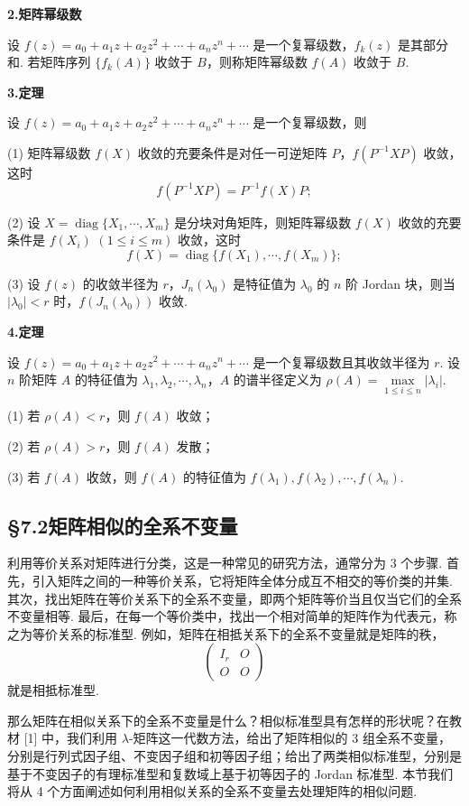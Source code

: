 \documentclass[UTF8,12pt,a4paper,fontset=fandol]{ctexart}
\begin{document}
\noindent\textbf{2.\quad 矩阵幂级数}

设 $f(z)=a_0+a_1z+a_2z^2+\cdots+a_nz^n+\cdots$ 是一个复幂级数，$f_k(z)$ 是其部分和. 若矩阵序列 $\{f_k(A)\}$ 收敛于 $B$，则称矩阵幂级数 $f(A)$ 收敛于 $B$.

\noindent\textbf{3.\quad 定理}

设 $f(z)=a_0+a_1z+a_2z^2+\cdots+a_nz^n+\cdots$ 是一个复幂级数，则

(1) 矩阵幂级数 $f(X)$ 收敛的充要条件是对任一可逆矩阵 $P$，$f(P^{-1}XP)$ 收敛，这时
\[
f(P^{-1}XP)=P^{-1}f(X)P;
\]

(2) 设 $X=\operatorname{diag}\{X_1,\cdots,X_m\}$ 是分块对角矩阵，则矩阵幂级数 $f(X)$ 收敛的充要条件是 $f(X_i)$ $(1\le i\le m)$ 收敛，这时
\[
f(X)=\operatorname{diag}\{f(X_1),\cdots,f(X_m)\};
\]

(3) 设 $f(z)$ 的收敛半径为 $r$，$J_n(\lambda_0)$ 是特征值为 $\lambda_0$ 的 $n$ 阶 Jordan 块，则当 $|\lambda_0|<r$ 时，$f(J_n(\lambda_0))$ 收敛.

\noindent\textbf{4.\quad 定理}

设 $f(z)=a_0+a_1z+a_2z^2+\cdots+a_nz^n+\cdots$ 是一个复幂级数且其收敛半径为 $r$.
设 $n$ 阶矩阵 $A$ 的特征值为 $\lambda_1,\lambda_2,\cdots,\lambda_n$，$A$ 的谱半径定义为 $\rho(A)=\max\limits_{1\le i\le n}|\lambda_i|$.

(1) 若 $\rho(A)<r$，则 $f(A)$ 收敛；

(2) 若 $\rho(A)>r$，则 $f(A)$ 发散；

(3) 若 $f(A)$ 收敛，则 $f(A)$ 的特征值为 $f(\lambda_1),f(\lambda_2),\cdots,f(\lambda_n)$.

\subsection*{§7.2\quad 矩阵相似的全系不变量}

利用等价关系对矩阵进行分类，这是一种常见的研究方法，通常分为 3 个步骤. 首先，引入矩阵之间的一种等价关系，它将矩阵全体分成互不相交的等价类的并集. 其次，找出矩阵在等价关系下的全系不变量，即两个矩阵等价当且仅当它们的全系不变量相等. 最后，在每一个等价类中，找出一个相对简单的矩阵作为代表元，称之为等价关系的标准型. 例如，矩阵在相抵关系下的全系不变量就是矩阵的秩，
\[
\left(\begin{array}{cc}
I_r & O\\
O & O
\end{array}\right)
\]
就是相抵标准型.

那么矩阵在相似关系下的全系不变量是什么？相似标准型具有怎样的形状呢？在教材 [1] 中，我们利用 $\lambda$-矩阵这一代数方法，给出了矩阵相似的 3 组全系不变量，分别是行列式因子组、不变因子组和初等因子组；给出了两类相似标准型，分别是基于不变因子的有理标准型和复数域上基于初等因子的 Jordan 标准型. 本节我们将从 4 个方面阐述如何利用相似关系的全系不变量去处理矩阵的相似问题.
\end{document}
